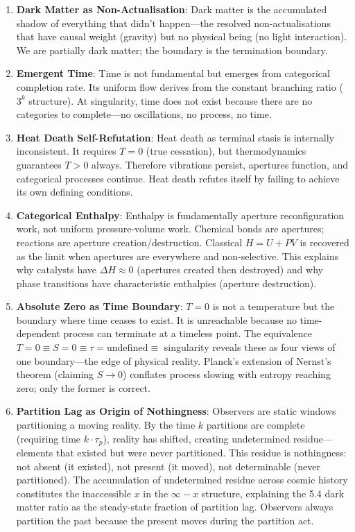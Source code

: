 \documentclass[12pt,a4paper]{article}
\theoremstyle{definition}
\theoremstyle{remark}
\begin{document}
\begin{enumerate}
    \item \textbf{Dark Matter as Non-Actualisation}: Dark matter is the accumulated shadow of everything that didn't happen---the resolved non-actualisations that have causal weight (gravity) but no physical being (no light interaction). We are partially dark matter; the boundary is the termination boundary.

    \item \textbf{Emergent Time}: Time is not fundamental but emerges from categorical completion rate. Its uniform flow derives from the constant branching ratio ($3^k$ structure). At singularity, time does not exist because there are no categories to complete---no oscillations, no process, no time.

    \item \textbf{Heat Death Self-Refutation}: Heat death as terminal stasis is internally inconsistent. It requires $T = 0$ (true cessation), but thermodynamics guarantees $T > 0$ always. Therefore vibrations persist, apertures function, and categorical processes continue. Heat death refutes itself by failing to achieve its own defining conditions.

    \item \textbf{Categorical Enthalpy}: Enthalpy is fundamentally aperture reconfiguration work, not uniform pressure-volume work. Chemical bonds are apertures; reactions are aperture creation/destruction. Classical $H = U + PV$ is recovered as the limit when apertures are everywhere and non-selective. This explains why catalysts have $\Delta H \approx 0$ (apertures created then destroyed) and why phase transitions have characteristic enthalpies (aperture destruction).

    \item \textbf{Absolute Zero as Time Boundary}: $T = 0$ is not a temperature but the boundary where time ceases to exist. It is unreachable because no time-dependent process can terminate at a timeless point. The equivalence $T = 0 \equiv S = 0 \equiv \tau = \text{undefined} \equiv$ singularity reveals these as four views of one boundary---the edge of physical reality. Planck's extension of Nernst's theorem (claiming $S \to 0$) conflates process slowing with entropy reaching zero; only the former is correct.
    
    \item \textbf{Partition Lag as Origin of Nothingness}: Observers are static windows partitioning a moving reality. By the time $k$ partitions are complete (requiring time $k \cdot \tau_p$), reality has shifted, creating undetermined residue---elements that existed but were never partitioned. This residue is nothingness: not absent (it existed), not present (it moved), not determinable (never partitioned). The accumulation of undetermined residue across cosmic history constitutes the inaccessible $x$ in the $\infty - x$ structure, explaining the 5.4 dark matter ratio as the steady-state fraction of partition lag. Observers always partition the past because the present moves during the partition act.
    

\end{enumerate}
\end{document}
